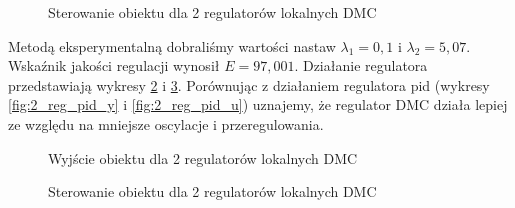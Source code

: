 \begin{figure}[H]
\centering
{}
\caption{Sterowanie obiektu dla 2 regulatorów lokalnych DMC}
\label{fig:21_reg_dmc_u}
\end{figure}

Metodą eksperymentalną dobraliśmy wartości nastaw $\lambda_1=0,1$ i $\lambda_2=5,07$. Wskaźnik jakości regulacji wynosił $E=97,001$. Działanie regulatora przedstawiają wykresy \ref{fig:22_reg_dmc_y} i \ref{fig:22_reg_dmc_u}. Porównując z działaniem regulatora pid (wykresy \ref{fig:2_reg_pid_y} i \ref{fig:2_reg_pid_u}) uznajemy, że regulator DMC działa lepiej ze względu na mniejsze oscylacje i przeregulowania.

\begin{figure}[H]
\centering
{}
\caption{Wyjście obiektu dla 2 regulatorów lokalnych DMC}
\label{fig:22_reg_dmc_y}
\end{figure}

\begin{figure}[H]
\centering
{}
\caption{Sterowanie obiektu dla 2 regulatorów lokalnych DMC}
\label{fig:22_reg_dmc_u}
\end{figure}